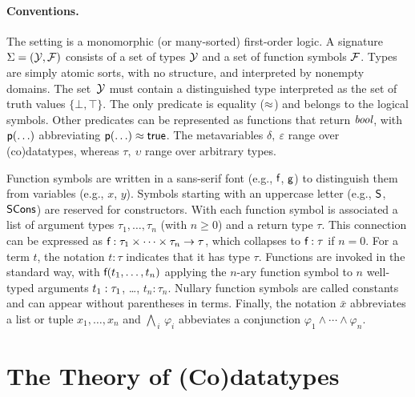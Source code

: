 \paragraph{Conventions.}
The setting is a monomorphic (or many-sorted) first-order logic.
A signature $\mathrm{\Sigma} = (\mathcal{Y}, \mathcal{F})$ consists of a set of types $\mathcal{Y}$ and a
set of function symbols $\mathcal{F}$. Types are simply atomic sorts, with no
structure, and interpreted by nonempty domains. The set~$\mathcal{Y}$ must contain a
distinguished type  interpreted as the set of truth
values $\{\bot, \top\}$. %
The only predicate is equality ($\approx$) and belongs to the logical symbols.
Other predicates can be represented as functions that return $\textit{bool}$,
with $\textsf{p}(\ldots)$ abbreviating $\textsf{p}(\ldots) \approx \textsf{true}$.
The metavariables $\delta,\:\varepsilon$ range over (co)datatypes,
whereas $\tau,\:\upsilon$ range over arbitrary types.

Function symbols are written in a sans-serif font (e.g., $\textsf{f}$, $\textsf{g}$) to
distinguish them from variables (e.g., $x$, $y$). Symbols starting with an uppercase
letter (e.g.,
$\textsf{S}$, $\textsf{SCons}$) are reserved for constructors. With each function symbol 
is associated a list of argument types $\tau_1,\ldots,\tau_n$ (with $n \ge 0$)
and a return type $\tau$. This connection can be expressed %
as $\textsf{f} : \tau_1 \times \cdots \times \tau_n \to \tau$,
which collapses to $\textsf{f} : \tau$ if $n = 0$.
For a term $t$, the notation $t : \tau$ indicates that it has type $\tau$.
Functions are invoked in the standard way, with $\textsf{f}(t_1,\ldots,t_n)$
applying the $n$-ary function symbol
 to $n$ well-typed arguments $t_1 :\nobreak \tau_1$, \ldots, $t_n :
\tau_n$. Nullary function symbols are called constants and can appear without
parentheses in terms.
%
Finally, the notation $\bar x$ abbreviates a list or tuple $x_1,\ldots,x_n$
and $\bigwedge_{\,i}\, \varphi_i$ abbeviates a conjunction
$\varphi_1 \mathrel\land \cdots \mathrel\land \varphi_n$.


\section{The Theory of (Co)datatypes}
\label{sec:the-theory-of-co-datatypes}

